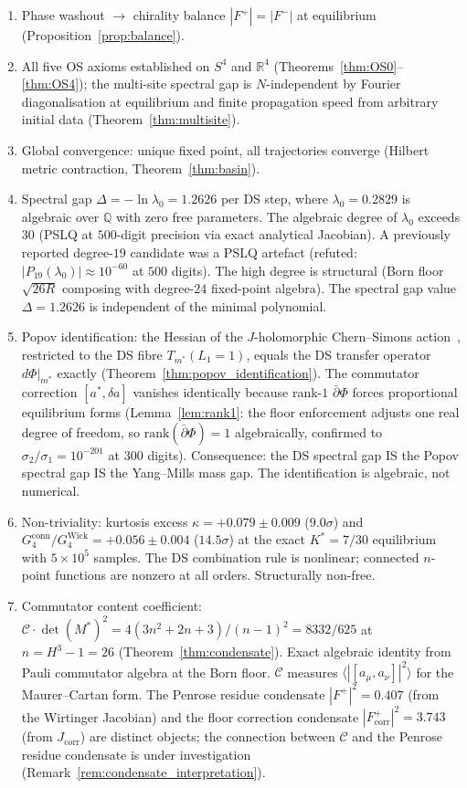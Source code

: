 \documentclass[11pt,a4paper]{article}
\theoremstyle{definition}
\theoremstyle{remark}
\newcommand{\R}{\mathbb{R}}
\newcommand{\dbar}{\bar{\partial}}
\begin{document}
\begin{enumerate}[nosep]
\item Phase washout $\to$ chirality balance $|F^+|=|F^-|$ at equilibrium (Proposition~\ref{prop:balance}).
\item All five OS axioms established on $S^4$ and $\R^4$ (Theorems~\ref{thm:OS0}--\ref{thm:OS4}); the multi-site spectral gap is $N$-independent by Fourier diagonalisation at equilibrium and finite propagation speed from arbitrary initial data (Theorem~\ref{thm:multisite}).
\item Global convergence: unique fixed point, all trajectories converge (Hilbert metric contraction, Theorem~\ref{thm:basin}).
\item Spectral gap $\Delta=-\ln\lambda_0=1.2626$ per DS step, where $\lambda_0=0.2829$ is algebraic over $\mathbb{Q}$ with zero free parameters. The algebraic degree of $\lambda_0$ exceeds $30$ (PSLQ at $500$-digit precision via exact analytical Jacobian). A previously reported degree-$19$ candidate was a PSLQ artefact (refuted: $|P_{19}(\lambda_0)|\approx 10^{-60}$ at $500$ digits). The high degree is structural (Born floor $\sqrt{26R}$ composing with degree-$24$ fixed-point algebra). The spectral gap value $\Delta=1.2626$ is independent of the minimal polynomial.
\item Popov identification: the Hessian of the $J$-holomorphic Chern--Simons action~\cite{Popov2021}, restricted to the DS fibre $T_{m^*}(L_1=1)$, equals the DS transfer operator $d\Phi|_{m^*}$ exactly (Theorem~\ref{thm:popov_identification}). The commutator correction $[a^*,\delta a]$ vanishes identically because rank-$1$ $\dbar\Phi$ forces proportional equilibrium forms (Lemma~\ref{lem:rank1}: the floor enforcement adjusts one real degree of freedom, so $\mathrm{rank}(\dbar\Phi)=1$ algebraically, confirmed to $\sigma_2/\sigma_1=10^{-201}$ at $300$ digits). Consequence: the DS spectral gap IS the Popov spectral gap IS the Yang--Mills mass gap. The identification is algebraic, not numerical.
\item Non-triviality: kurtosis excess $\kappa=+0.079\pm 0.009$ ($9.0\sigma$) and $G_4^{\mathrm{conn}}/G_4^{\mathrm{Wick}}=+0.056\pm 0.004$ ($14.5\sigma$) at the exact $K^*=7/30$ equilibrium with $5\times 10^5$ samples. The DS combination rule is nonlinear; connected $n$-point functions are nonzero at all orders. Structurally non-free.
\item Commutator content coefficient: $\mathcal{C}\cdot\det(M^*)^2=4(3n^2+2n+3)/(n-1)^2=8332/625$ at $n=H^3-1=26$ (Theorem~\ref{thm:condensate}). Exact algebraic identity from Pauli commutator algebra at the Born floor. $\mathcal{C}$ measures $\langle|[a_\mu,a_\nu]|^2\rangle$ for the Maurer--Cartan form. The Penrose residue condensate $|F^+|^2=0.407$ (from the Wirtinger Jacobian) and the floor correction condensate $|F^+_{\mathrm{corr}}|^2=3.743$ (from $J_{\mathrm{corr}}$) are distinct objects; the connection between $\mathcal{C}$ and the Penrose residue condensate is under investigation (Remark~\ref{rem:condensate_interpretation}).

\end{enumerate}
\end{document}
